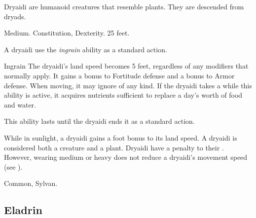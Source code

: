         Dryaidi are humanoid creatures that resemble plants. They are descended from dryads.

         Medium.
          Constitution,  Dexterity.
         25 feet.
        \begin{itemize}
             A dryaidi use the \textit{ingrain} ability as a standard action.
                \begin{freeability}{Ingrain}
                    The dryaidi's land speed becomes 5 feet, regardless of any modifiers that normally apply.
                    It gains a  bonus to Fortitude defense and a  bonus to Armor defense.
                    When moving, it may ignore  of any kind.
                    If the dryaidi takes a  while this ability is active, it acquires nutrients sufficient to replace a day's worth of food and water.

                    This ability lasts until the dryaidi ends it as a standard action.
                \end{freeability}
             While in sunlight, a dryaidi gains a  foot bonus to its land speed.
             A dryaidi is considered both a creature and a plant.
             Dryaidi have a  penalty to their .
                However, wearing medium or heavy  does not reduce a dryaidi's movement speed (see ).
        \end{itemize}
         Common, Sylvan.

    \subsection{Eladrin}

